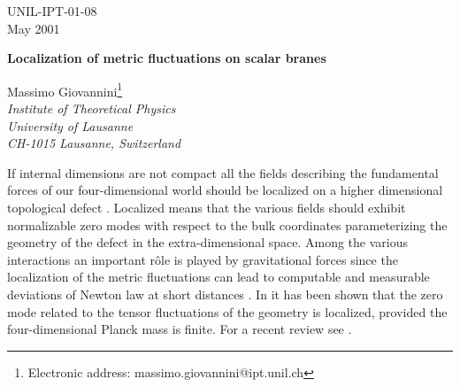 \documentclass[a4paper,12pt]{article}
\begin{document}
\topmargin -1.0cm
\oddsidemargin -0.8cm
\evensidemargin -0.8cm
\pagestyle{empty}
\begin{flushright}
UNIL-IPT-01-08\\
May 2001
\end{flushright}
\vspace*{5mm}

\begin{center}

{\Large\bf Localization of metric fluctuations on scalar branes}\\
\vspace{1.0cm}

{\large Massimo Giovannini\footnote{Electronic address: 
massimo.giovannini@ipt.unil.ch}}\\
\vspace{.6cm}
{\it {Institute of Theoretical Physics\\ University of Lausanne\\ 
CH-1015 Lausanne, Switzerland}}
\vspace{.4cm}
\end{center}

\vspace{1cm}
\begin{abstract}
The localization of metric fluctuations on scalar brane configurations 
breaking spontaneously five-dimensional Poincar\'e invariance is discussed. 
Assuming that the four-dimensional Planck mass is finite and that the
geometry is regular, it is demonstrated that  the vector and scalar 
fluctuations of the metric are not localized on the brane. 
\end{abstract}


\vfill

\eject
\pagestyle{empty}
\setcounter{page}{1}
\setcounter{footnote}{0}
\pagestyle{plain}


If internal dimensions are not compact \cite{RS1,RS2,akama,visser}  
all the fields describing 
the fundamental forces of our four-dimensional world should 
be localized on a higher dimensional topological 
defect \cite{RS1,RS2}. Localized means that 
the various fields should exhibit normalizable zero modes with respect 
to the bulk coordinates parameterizing the geometry of the 
defect in the extra-dimensional space. 
Among the various interactions an important  r\^ole is played by 
gravitational forces \cite{rusu1,rusu2}
 since the localization of the metric fluctuations 
can lead to computable and measurable deviations of Newton law at short 
distances \cite{exp}. In \cite{rusu2} it has been shown that the zero mode 
related to the tensor fluctuations of the geometry is localized, provided
the four-dimensional Planck mass is finite. For a recent 
review see \cite{rub}.
\end{document}
